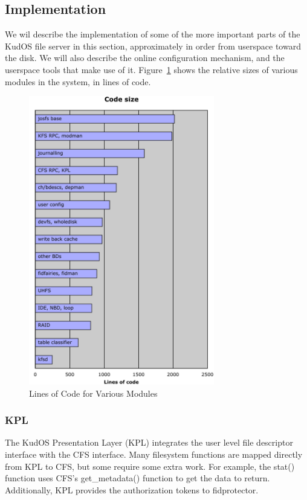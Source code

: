 \subsection{Implementation}
\label{sec:solution:impl}

We wil describe the implementation of some of the more important parts of the
KudOS file server in this section, approximately in order from userspace toward
the disk. We will also describe the online configuration mechanism, and the
userspace tools that make use of it. Figure~\ref{fig:loc} shows the relative
sizes of various modules in the system, in lines of code.

\begin{figure}[htb]
\begin{center}
  \includegraphics[width=8.1cm]{loc_graph}
  \caption{Lines of Code for Various Modules}
  \label{fig:loc}
\end{center}
\end{figure}

\subsubsection{KPL}
\label{sec:solution:impl:kpl}

The KudOS Presentation Layer (KPL) integrates the user level file descriptor
interface with the CFS interface. Many filesystem functions are mapped directly
from KPL to CFS, but some require some extra work. For example, the stat()
function uses CFS's get\_metadata() function to get the data to return.
Additionally, KPL provides the authorization tokens to fidprotector.

